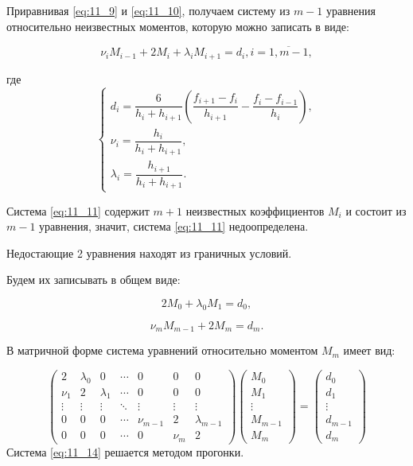 Приравнивая \eqref{eq:11_9} и \eqref{eq:11_10}, получаем систему из $m - 1$ уравнения относительно неизвестных моментов, которую можно записать в виде:

\begin{equation}\label{eq:11_11}
  \nu_i M_{i - 1} + 2 M_i + \lambda_i M_{i + 1} = d_i, i = \overline{1, m - 1},
\end{equation}

где
\begin{equation*}
  \begin{cases}
    d_i = \dfrac{6}{h_i + h_{i + 1}} \left( \dfrac{f_{i + 1} - f_i}{h_{i + 1}} - \dfrac{f_{i} - f_{i - 1}}{h_{i}} \right), \\
    \nu_i = \dfrac{h_i}{h_i + h_{i + 1}}, \\
    \lambda_i = \dfrac{h_{i + 1}}{h_i + h_{i + 1}}.
  \end{cases}
\end{equation*}

Система \eqref{eq:11_11} содержит $m+1$ неизвестных коэффициентов $M_i$ и состоит из $m-1$ уравнения, значит, система \eqref{eq:11_11} недоопределена.

Недостающие 2 уравнения находят из граничных условий.

Будем их записывать в общем виде:

\begin{equation*}
  2 M_0 + \lambda_0 M_1 = d_0,
\end{equation*}

\begin{equation*}
  \nu_m M_{m - 1} + 2 M_m = d_m.
\end{equation*}

В матричной форме система уравнений относительно моментом $M_m$ имеет вид:

\begin{equation}\label{eq:11_14}
\begin{pmatrix}
  2 & \lambda_0 & 0 & \cdots & 0 & 0 & 0\\
  \nu_1 & 2 & \lambda_1 & \cdots & 0 & 0 & 0 \\
  \vdots  & \vdots & \vdots & \ddots & \vdots & \vdots & \vdots \\
  0 & 0 & 0 & \cdots & \nu_{m - 1} & 2 & \lambda_{m - 1} \\
  0 & 0 & 0 & \cdots & 0 & \nu_m & 2 
 \end{pmatrix} \begin{pmatrix}
  M_0 \\
  M_1 \\
  \vdots \\
  M_{m-1} \\
  M_m
 \end{pmatrix}
 = 
 \begin{pmatrix}
  d_0 \\
  d_1 \\
  \vdots \\
  d_{m-1} \\
  d_m
 \end{pmatrix}
 \end{equation}
Система \eqref{eq:11_14} решается методом прогонки.

